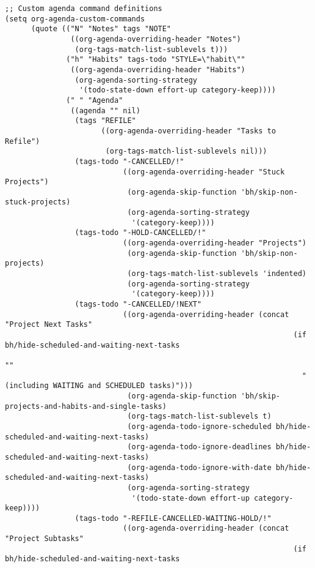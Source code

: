 \documentclass[11pt]{scrartcl}
\begin{document}
\begin{verbatim}
;; Custom agenda command definitions
(setq org-agenda-custom-commands
      (quote (("N" "Notes" tags "NOTE"
               ((org-agenda-overriding-header "Notes")
                (org-tags-match-list-sublevels t)))
              ("h" "Habits" tags-todo "STYLE=\"habit\""
               ((org-agenda-overriding-header "Habits")
                (org-agenda-sorting-strategy
                 '(todo-state-down effort-up category-keep))))
              (" " "Agenda"
               ((agenda "" nil)
                (tags "REFILE"
                      ((org-agenda-overriding-header "Tasks to Refile")
                       (org-tags-match-list-sublevels nil)))
                (tags-todo "-CANCELLED/!"
                           ((org-agenda-overriding-header "Stuck Projects")
                            (org-agenda-skip-function 'bh/skip-non-stuck-projects)
                            (org-agenda-sorting-strategy
                             '(category-keep))))
                (tags-todo "-HOLD-CANCELLED/!"
                           ((org-agenda-overriding-header "Projects")
                            (org-agenda-skip-function 'bh/skip-non-projects)
                            (org-tags-match-list-sublevels 'indented)
                            (org-agenda-sorting-strategy
                             '(category-keep))))
                (tags-todo "-CANCELLED/!NEXT"
                           ((org-agenda-overriding-header (concat "Project Next Tasks"
                                                                  (if bh/hide-scheduled-and-waiting-next-tasks
                                                                      ""
                                                                    " (including WAITING and SCHEDULED tasks)")))
                            (org-agenda-skip-function 'bh/skip-projects-and-habits-and-single-tasks)
                            (org-tags-match-list-sublevels t)
                            (org-agenda-todo-ignore-scheduled bh/hide-scheduled-and-waiting-next-tasks)
                            (org-agenda-todo-ignore-deadlines bh/hide-scheduled-and-waiting-next-tasks)
                            (org-agenda-todo-ignore-with-date bh/hide-scheduled-and-waiting-next-tasks)
                            (org-agenda-sorting-strategy
                             '(todo-state-down effort-up category-keep))))
                (tags-todo "-REFILE-CANCELLED-WAITING-HOLD/!"
                           ((org-agenda-overriding-header (concat "Project Subtasks"
                                                                  (if bh/hide-scheduled-and-waiting-next-tasks

\end{verbatim}
\end{document}
